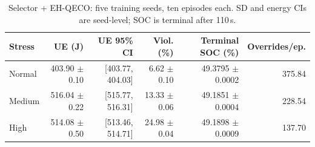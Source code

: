\begin{table}[t]
\centering\footnotesize
\caption{Selector + EH-QECO: five training seeds, ten episodes each. SD and energy CIs are seed-level; SOC is terminal after 110\,s.}
\label{tab:combined}
\begin{tabular}{@{}lrrrrr@{}}\toprule
Stress & UE (J) & UE 95\% CI & Viol. (\%) & Terminal SOC (\%) & Overrides/ep.\\\midrule
Normal & 403.90 $\pm$ 0.10 & [403.77, 404.03] & 6.62 $\pm$ 0.10 & 49.3795 $\pm$ 0.0002 & 375.84 \\
Medium & 516.04 $\pm$ 0.22 & [515.77, 516.31] & 13.33 $\pm$ 0.06 & 49.1851 $\pm$ 0.0004 & 228.54 \\
High & 514.08 $\pm$ 0.50 & [513.46, 514.71] & 24.98 $\pm$ 0.04 & 49.1898 $\pm$ 0.0009 & 137.70 \\
\bottomrule\end{tabular}
\end{table}
